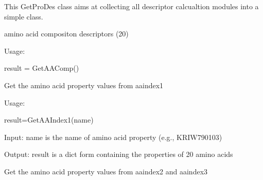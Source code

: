 \documentclass[letterpaper,10pt,english]{sphinxmanual}
\begin{document}
\begin{fulllineitems}
\label{reference/PyProteinclass:PyProtein.PyProtein}
This GetProDes class aims at collecting all descriptor calcualtion modules into a simple class.

\begin{fulllineitems}
\label{reference/PyProteinclass:PyProtein.PyProtein.AALetter}
\end{fulllineitems}


\begin{fulllineitems}
\label{reference/PyProteinclass:PyProtein.PyProtein.GetAAComp}
amino acid compositon descriptors (20)

Usage:

result = GetAAComp()

\end{fulllineitems}


\begin{fulllineitems}
\label{reference/PyProteinclass:PyProtein.PyProtein.GetAAindex1}
Get the amino acid property values from aaindex1

Usage:

result=GetAAIndex1(name)

Input: name is the name of amino acid property (e.g., KRIW790103)

Output: result is a dict form containing the properties of 20 amino acids

\end{fulllineitems}


\begin{fulllineitems}
\label{reference/PyProteinclass:PyProtein.PyProtein.GetAAindex23}
Get the amino acid property values from aaindex2 and aaindex3


\end{fulllineitems}
\end{fulllineitems}
\end{document}
